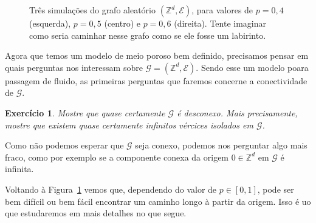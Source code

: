 \documentclass[reqno, draft]{book}
\newcommand*\1{\mathds{1}}
\newtheorem{exercise}[example]{Exercício}
\begin{document}
\begin{figure}[!ht]
  \centering
  \caption{Três simulações do grafo aleatório $(\mathbb{Z}^d, \mathcal{E})$, para valores de $p = 0,4$ (esquerda), $p = 0,5$ (centro) e $p = 0,6$ (direita). Tente imaginar como seria caminhar nesse grafo como se ele fosse um labirinto.}
  \label{f:percola}
\end{figure}

Agora que temos um modelo de meio poroso bem definido, precisamos pensar em quais perguntas nos interessam sobre $\mathcal{G} = (\mathbb{Z}^d, \mathcal{E})$.
Sendo esse um modelo poara passagem de fluido, as primeiras perguntas que faremos concerne a conectividade de $\mathcal{G}$.

\begin{exercise}
  Mostre que quase certamente $\mathcal{G}$ é desconexo.
  Mais precisamente, mostre que existem quase certamente infinitos vércices isolados em $\mathcal{G}$.
\end{exercise}

Como não podemos esperar que $\mathcal{G}$ seja conexo, podemos nos perguntar algo mais fraco, como por exemplo se a componente conexa da origem $0 \in \mathbb{Z}^d$ em $\mathcal{G}$ é infinita.

Voltando à Figura~\ref{f:percola} vemos que, dependendo do valor de $p \in [0,1]$, pode ser bem difícil ou bem fácil encontrar um caminho longo à partir da origem.
Isso é uo que estudaremos em mais detalhes no que segue.
\end{document}
